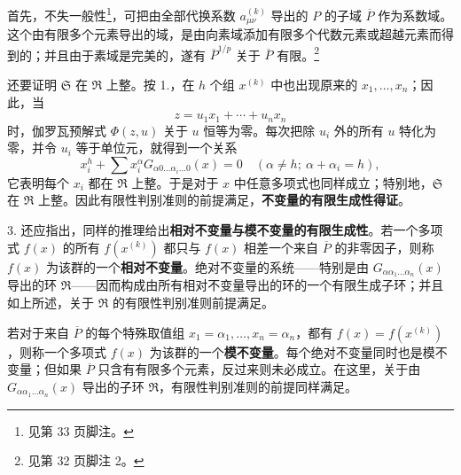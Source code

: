 \documentclass[11pt]{article}
\newcommand{\srcemph}[1]{\textbf{#1}}
\begin{document}
首先，不失一般性\footnote{见第 33 页脚注。}，可把由全部代换系数 $a_{\mu\nu}^{(k)}$ 导出的 $P$ 的子域 $\overline P$ 作为系数域。这个由有限多个元素导出的域，是由向素域添加有限多个代数元素或超越元素而得到的；并且由于素域是完美的，遂有 $\overline P^{1/p}$ 关于 $\overline P$ 有限。\footnote{见第 32 页脚注 2。}

还要证明 $\mathfrak S$ 在 $\mathfrak R$ 上整。按 1.，在 $h$ 个组 $x^{(k)}$ 中也出现原来的 $x_1,\ldots,x_n$；因此，当
\[
 z=u_1x_1+\cdots+u_nx_n
\]
时，伽罗瓦预解式 $\Phi(z,u)$ 关于 $u$ 恒等为零。每次把除 $u_i$ 外的所有 $u$ 特化为零，并令 $u_i$ 等于单位元，就得到一个关系
\[
 x_i^h+\sum x_i^\alpha G_{\alpha0\ldots\alpha_i\ldots0}(x)=0
 \quad (\alpha\ne h;\ \alpha+\alpha_i=h),
\]
它表明每个 $x_i$ 都在 $\mathfrak R$ 上整。于是对于 $x$ 中任意多项式也同样成立；特别地，$\mathfrak S$ 在 $\mathfrak R$ 上整。因此有限性判别准则的前提满足，\srcemph{不变量的有限生成性得证}。

3. 还应指出，同样的推理给出\srcemph{相对不变量与模不变量的有限生成性}。若一个多项式 $f(x)$ 的所有 $f(x^{(k)})$ 都只与 $f(x)$ 相差一个来自 $\overline P$ 的非零因子，则称 $f(x)$ 为该群的一个\srcemph{相对不变量}。绝对不变量的系统——特别是由 $G_{\alpha\alpha_1\ldots\alpha_n}(x)$ 导出的环 $\mathfrak R$——因而构成由所有相对不变量导出的环的一个有限生成子环；并且如上所述，关于 $\mathfrak R$ 的有限性判别准则前提满足。

若对于来自 $\overline P$ 的每个特殊取值组 $x_1=\alpha_1,\ldots,x_n=\alpha_n$，都有 $f(x)=f(x^{(k)})$，则称一个多项式 $f(x)$ 为该群的一个\srcemph{模不变量}。每个绝对不变量同时也是模不变量；但如果 $\overline P$ 只含有有限多个元素，反过来则未必成立。在这里，关于由 $G_{\alpha\alpha_1\ldots\alpha_n}(x)$ 导出的子环 $\mathfrak R$，有限性判别准则的前提同样满足。
\end{document}
